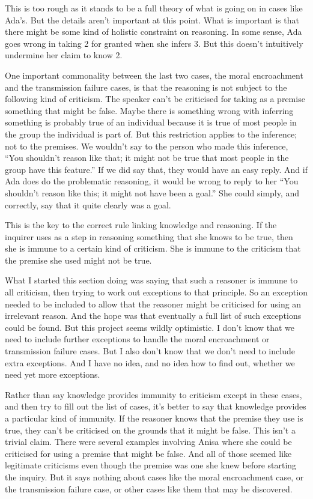 \documentclass[
  11pt,
]{book}
\begin{document}
This is too rough as it stands to be a full theory of what is going on in cases like Ada's. But the details aren't important at this point. What is important is that there might be some kind of holistic constraint on reasoning. In some sense, Ada goes wrong in taking 2 for granted when she infers 3. But this doesn't intuitively undermine her claim to know 2.

One important commonality between the last two cases, the moral encroachment and the transmission failure cases, is that the reasoning is not subject to the following kind of criticism. The speaker can't be criticised for taking as a premise something that might be false. Maybe there is something wrong with inferring something is probably true of an individual because it is true of most people in the group the individual is part of. But this restriction applies to the inference; not to the premises. We wouldn't say to the person who made this inference, ``You shouldn't reason like that; it might not be true that most people in the group have this feature.'' If we did say that, they would have an easy reply. And if Ada does do the problematic reasoning, it would be wrong to reply to her ``You shouldn't reason like this; it might not have been a goal.'' She could simply, and correctly, say that it quite clearly was a goal.

This is the key to the correct rule linking knowledge and reasoning. If the inquirer uses as a step in reasoning something that she knows to be true, then she is immune to a certain kind of criticism. She is immune to the criticism that the premise she used might not be true.

What I started this section doing was saying that such a reasoner is immune to all criticism, then trying to work out exceptions to that principle. So an exception needed to be included to allow that the reasoner might be criticised for using an irrelevant reason. And the hope was that eventually a full list of such exceptions could be found. But this project seems wildly optimistic. I don't know that we need to include further exceptions to handle the moral encroachment or transmission failure cases. But I also don't know that we don't need to include extra exceptions. And I have no idea, and no idea how to find out, whether we need yet more exceptions.

Rather than say knowledge provides immunity to criticism except in these cases, and then try to fill out the list of cases, it's better to say that knowledge provides a particular kind of immunity. If the reasoner knows that the premise they use is true, they can't be criticised on the grounds that it might be false. This isn't a trivial claim. There were several examples involving Anisa where she could be criticised for using a premise that might be false. And all of those seemed like legitimate criticisms even though the premise was one she knew before starting the inquiry. But it says nothing about cases like the moral encroachment case, or the transmission failure case, or other cases like them that may be discovered.
\end{document}

